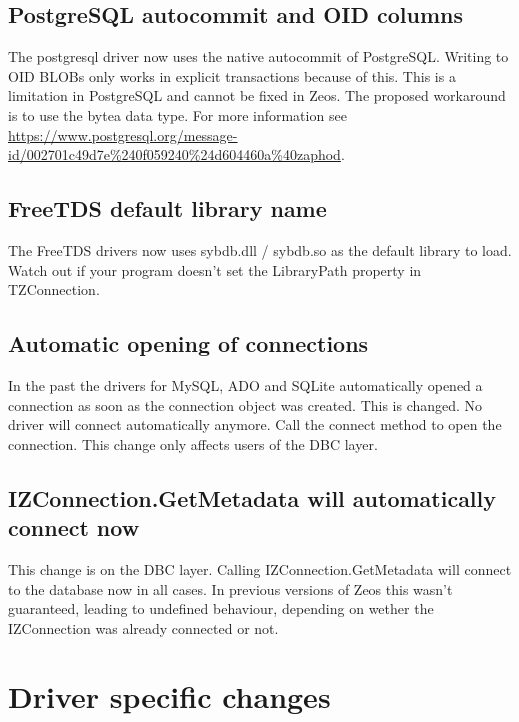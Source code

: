 \documentclass[a4paper,12pt,oneside]{book}
\begin{document}
\subsection{PostgreSQL autocommit and OID columns}
\label{sec:Rev4_BreakingChanges_PostgresqlAutocommitOids}
The postgresql driver now uses the native autocommit of PostgreSQL.
Writing to OID BLOBs only works in explicit transactions because of this. 
This is a limitation in PostgreSQL and cannot be fixed in Zeos.
The proposed workaround is to use the bytea data type.
For more information see \url{https://www.postgresql.org/message-id/002701c49d7e%240f059240%24d604460a%40zaphod}.

\subsection{FreeTDS default library name}
\label{sec:Rev4_BreakingChanges_FreetdsDefaultLIbraryName}
The FreeTDS drivers now uses sybdb.dll / sybdb.so as the default library to load.
Watch out if your program doesn't set the LibraryPath property in TZConnection.

\subsection{Automatic opening of connections}
\label{Rev4_BreakingChanges_AutomaticOpeningOfConnections}
In the past the drivers for MySQL, ADO and SQLite automatically opened a connection as soon as the connection object was created.
This is changed.
No driver will connect automatically anymore.
Call the connect method to open the connection.
This change only affects users of the DBC layer.

\subsection{IZConnection.GetMetadata will automatically connect now}
\label{Rev4_BreakingChanges_IZConnectionGetMetadataAutoconnect}
This change is on the DBC layer.
Calling IZConnection.GetMetadata will connect to the database now in all cases.
In previous versions of Zeos this wasn't guaranteed, leading to undefined behaviour, depending on wether the IZConnection was already connected or not.

\section{Driver specific changes}
\label{sec:Rev4_DriverSpecificChanges}
\end{document}
